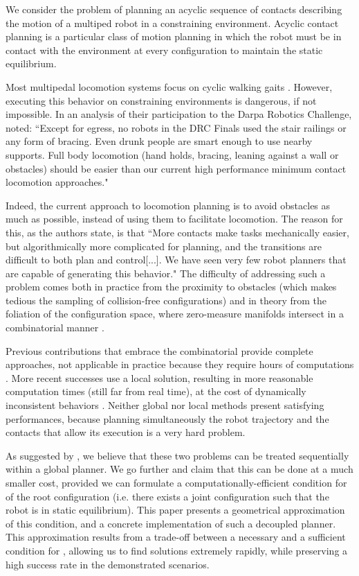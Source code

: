 We consider the problem of planning an acyclic sequence of contacts describing the motion of a multiped robot in a constraining environment. Acyclic contact planning is a particular class of motion planning in which the robot must be in contact with the environment at every configuration to maintain the static equilibrium.

Most multipedal locomotion systems focus on cyclic walking gaits \citep{Kajita03a}. However, executing
this behavior on constraining environments is dangerous, if not impossible.
In an analysis of their participation to the Darpa Robotics Challenge, \citeauthor{atkensondarpa}
noted: ``Except for egress, no robots in the DRC Finals used
the  stair  railings  or  any  form  of  bracing.   Even  drunk  people  are  smart  enough  to  use  nearby  supports.
Full body locomotion (hand holds,  bracing,  leaning against a wall or obstacles) should be easier than our
current high performance minimum contact locomotion approaches."

Indeed, the current approach to locomotion planning is to avoid obstacles as much as possible, instead of using them
to facilitate locomotion. The reason for this, as the authors state, is that ``More contacts make tasks
mechanically easier, but algorithmically more complicated for planning, and the transitions are difficult to
both plan and control[...].  We have seen very few robot planners that are  capable of  generating this  behavior."
The difficulty of addressing such a problem comes both in practice from the proximity to obstacles (which makes tedious the sampling of collision-free configurations) and in theory from the foliation of the configuration space, where zero-measure manifolds intersect in a combinatorial manner \citep{simeon-manipulation-04}.

Previous contributions that embrace the combinatorial provide complete approaches, not applicable in practice because they require hours of computations \citep{Bretl:2006:MPM:1124573.1124585}.
More recent successes use a local solution, resulting in more reasonable computation times (still far from real time), at the cost of dynamically inconsistent behaviors \citep{Mordatch:2012:DCB:2185520.2185539}.
Neither global nor local methods present satisfying performances, because planning simultaneously the robot trajectory and the contacts that allow
its execution is a very hard problem. 

As suggested by \cite{Bouyarmane2009}, we believe that these two problems can be treated sequentially within a global planner.
We go further and claim that this can be done at a much smaller cost, provided we can formulate a computationally-efficient condition for  of the root configuration (i.e. there exists a joint configuration such that the robot is in static equilibrium).
This paper presents a geometrical approximation of this condition, and a concrete implementation of such a decoupled planner.
This approximation results from a trade-off between a necessary and a sufficient condition for , allowing us to find solutions extremely rapidly, while preserving a high success rate in the demonstrated scenarios.

